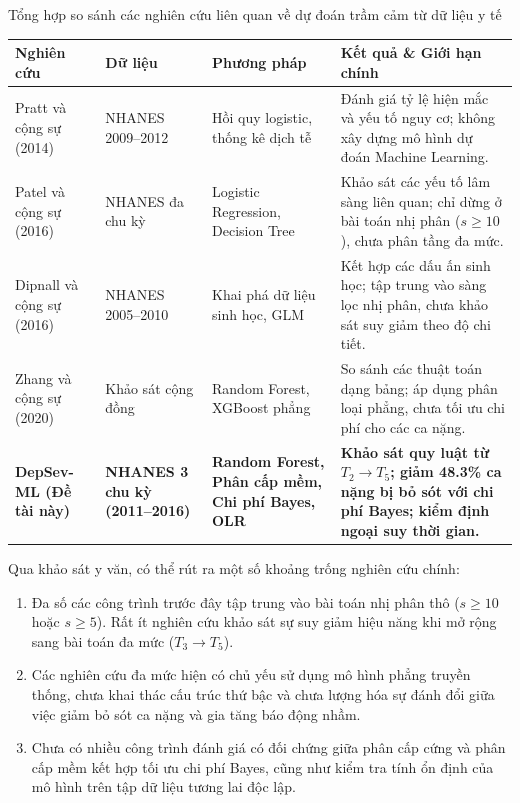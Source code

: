 \begin{table}{Tổng hợp so sánh các nghiên cứu liên quan về dự đoán trầm cảm từ dữ liệu y tế}
\centering
\small
\setlength{\tabcolsep}{5pt}
\label{tab:related-works}
\begin{tabularx}{\textwidth}{p{3.6cm} p{2.4cm} p{3.2cm} X}
\toprule
\textbf{Nghiên cứu} & \textbf{Dữ liệu} & \textbf{Phương pháp} & \textbf{Kết quả \& Giới hạn chính} \\
\midrule
Pratt và cộng sự (2014) \cite{pratt2014depression} & NHANES 2009--2012 & Hồi quy logistic, thống kê dịch tễ & Đánh giá tỷ lệ hiện mắc và yếu tố nguy cơ; không xây dựng mô hình dự đoán Machine Learning. \\
\midrule
Patel và cộng sự (2016) \cite{patel2016systematic} & NHANES đa chu kỳ & Logistic Regression, Decision Tree & Khảo sát các yếu tố lâm sàng liên quan; chỉ dừng ở bài toán nhị phân ($s \ge 10$), chưa phân tầng đa mức. \\
\midrule
Dipnall và cộng sự (2016) \cite{dipnall2016fusing} & NHANES 2005--2010 & Khai phá dữ liệu sinh học, GLM & Kết hợp các dấu ấn sinh học; tập trung vào sàng lọc nhị phân, chưa khảo sát suy giảm theo độ chi tiết. \\
\midrule
Zhang và cộng sự (2020) \cite{zhang2020machine} & Khảo sát cộng đồng & Random Forest, XGBoost phẳng & So sánh các thuật toán dạng bảng; áp dụng phân loại phẳng, chưa tối ưu chi phí cho các ca nặng. \\
\midrule
\textbf{DepSev-ML (Đề tài này)} & \textbf{NHANES 3 chu kỳ (2011--2016)} & \textbf{Random Forest, Phân cấp mềm, Chi phí Bayes, OLR} & \textbf{Khảo sát quy luật từ $T_2 \to T_5$; giảm 48.3\% ca nặng bị bỏ sót với chi phí Bayes; kiểm định ngoại suy thời gian.} \\
\bottomrule
\end{tabularx}
\end{table}

Qua khảo sát y văn, có thể rút ra một số khoảng trống nghiên cứu chính:
\begin{enumerate}
    \item Đa số các công trình trước đây tập trung vào bài toán nhị phân thô ($s \ge 10$ hoặc $s \ge 5$). Rất ít nghiên cứu khảo sát sự suy giảm hiệu năng khi mở rộng sang bài toán đa mức ($T_3 \to T_5$).
    \item Các nghiên cứu đa mức hiện có chủ yếu sử dụng mô hình phẳng truyền thống, chưa khai thác cấu trúc thứ bậc và chưa lượng hóa sự đánh đổi giữa việc giảm bỏ sót ca nặng và gia tăng báo động nhầm.
    \item Chưa có nhiều công trình đánh giá có đối chứng giữa phân cấp cứng và phân cấp mềm kết hợp tối ưu chi phí Bayes, cũng như kiểm tra tính ổn định của mô hình trên tập dữ liệu tương lai độc lập.
\end{enumerate}

